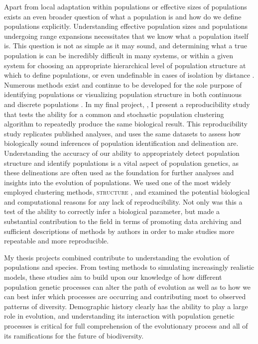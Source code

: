 Apart from local adaptation within populations or effective sizes of populations exists an even broader question of what a population is and how do we define populations explicitly. Understanding effective population sizes and populations undergoing range expansions necessitates that we know what a population itself is. This question is not as simple as it may sound, and determining what a true population is can be incredibly difficult in many systems, or within a given system for choosing an appropriate hierarchical level of population structure at which to define populations, or even undefinable in cases of isolation by distance \citep{Waples:2006}. Numerous methods exist and continue to be developed for the sole purpose of identifying populations or visualizing population structure in both continuous and discrete populations \citep{Pritchard:2000, Falush:2003, Falush:2007, Rosenberg:2004, Petkova:2015, Bradburd:2016}. In my final project, , I present a reproducibility study that tests the ability for a common and stochastic population clustering algorithm to repeatedly produce the same biological result. This reproducibility study replicates published analyses, and uses the same datasets to assess how biologically sound inferences of population identification and delineation are. Understanding the accuracy of our ability to appropriately detect population structure and identify populations is a vital aspect of population genetics, as these delineations are often used as the foundation for further analyses and insights into the evolution of populations. We used one of the most widely employed clustering methods, \textsc{structure} \citep{Pritchard:2000}, and examined the potential biological and computational reasons for any lack of reproducibility. Not only was this a test of the ability to correctly infer a biological parameter, but made a substantial contribution to the field in terms of promoting data archiving and sufficient descriptions of methods by authors in order to make studies more repeatable and more reproducible. 



My thesis projects combined contribute to understanding the evolution of populations and species. From testing methods to simulating increasingly realistic models, these studies aim to build upon our knowledge of how different population genetic processes can alter the path of evolution as well as to how we can best infer which processes are occurring and contributing most to observed patterns of diversity. Demographic history clearly has the ability to play a large role in evolution, and understanding its interaction with population genetic processes is critical for full comprehension of the evolutionary process and all of its ramifications for the future of biodiversity.







